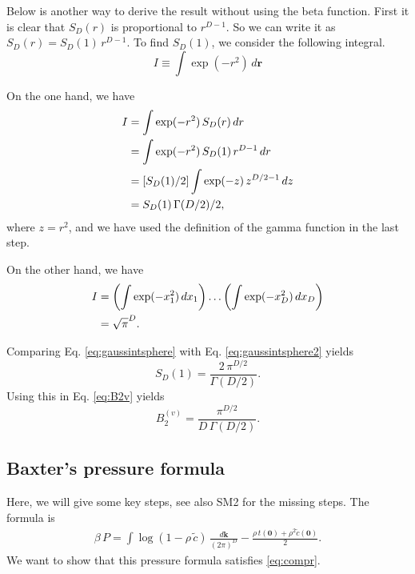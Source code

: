 \documentclass[preprint]{revtex4-1}
\numberwithin{equation}{subsection}
\numberwithin{table}{section}
\newcommand{\vct}[1]{\mathbf{#1}}
\providecommand{\vr}{} %
\renewcommand{\vr}{\vct{r}}
\newcommand{\vk}{\vct{k}}
\newcommand{\dvk}{\frac{d\vk}{(2\pi)^D}}
\begin{document}
Below is another way to derive the result without using the beta function.
%
First it is clear that $S_D(r)$ is proportional to $r^{D-1}$.
So we can write it as $S_D(r) = S_D(1) \, r^{D-1}$.
To find $S_D(1)$, we consider the following integral.
\[
I
\equiv
\int \exp(-r^2) \, d\vr
\]

On the one hand, we have
\begin{align}
  I
&=
  \int \exp(-r^2) \, S_D(r) \, d r
  \notag \\
&=
  \int \exp(-r^2) \, S_D(1) \, r^{D-1} \, dr
  \notag \\
&=
  [S_D(1)/2]
  \int \exp(-z) \, z^{D/2 - 1} \, dz
  \notag \\
&=
  S_D(1) \, \Gamma(D/2)/2,
\label{eq:gaussintsphere}
\end{align}
%
where $z = r^2$,
and we have used the definition of the gamma function in the last step.

On the other hand, we have
\begin{align}
  I
&=
  \left( \int \exp(-x_1^2) \, d x_1 \right)
  \dots
  \left( \int \exp(-x_D^2) \, d x_D \right) \notag \\
&=
  \sqrt\pi^D.
\label{eq:gaussintsphere2}
\end{align}

Comparing Eq. \eqref{eq:gaussintsphere} with Eq. \eqref{eq:gaussintsphere2}
yields
\begin{equation}
  S_D(1) = \frac{ 2 \, \pi^{D/2} } { \Gamma(D/2) }.
  \label{eq:surfareaD}
\end{equation}
Using this in Eq. \eqref{eq:B2v} yields
\[
  B_2^{(v)}
=
  \frac{ \pi^{D/2} } { D \, \Gamma(D/2) }.
\]



\subsection{Baxter's pressure formula}

Here, we will give some key steps, see also SM2
for the missing steps.
%
The formula is
\begin{align}
\beta \, P
=
\int
    \log(1 - \rho \, \tilde c)
   \, \dvk
  -
    \frac{\rho \, t(\vct{0}) + \rho^2 \tilde{c}(\vct{0}) } {2}.
  \label{eq:Pbaxter}
\end{align}
We want to show that this pressure formula satisfies \eqref{eq:compr}.
\end{document}
